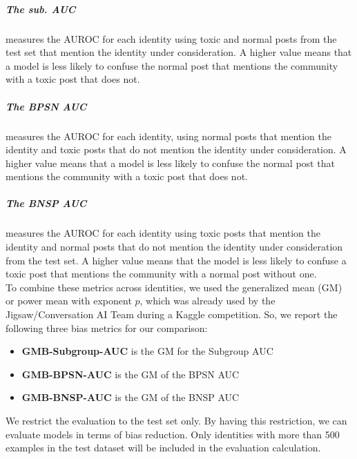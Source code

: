 \documentclass[a4paper,english]{rnti}
\makeatletter
\newcommand\foottotoref[1]{\protected@xdef\@thefnmark{\ref{#1}}\@footnotemark}
\makeatother
\begin{document}
 \subparagraph{The sub. AUC} measures the AUROC for each identity using toxic and normal posts from the test set that mention the identity under consideration. A higher value means that a model is less likely to confuse the normal post that mentions the community with a toxic post that does not. 
 
 \subparagraph{The BPSN AUC} measures the AUROC for each identity, using normal posts that mention the identity and toxic posts that do not mention the identity under consideration. A higher value means that a model is less likely to confuse the normal post that mentions the community with a toxic post that does not. 
 
 \subparagraph{The BNSP AUC} measures the AUROC for each identity using toxic posts that mention the identity and normal posts that do not mention the identity under consideration from the test set. A higher value means that the model is less likely to confuse a toxic post that mentions the community with a normal post without one.\\
 
To combine these metrics across identities, we used the generalized mean (GM) or power mean with exponent $p$, which was already used by the Jigsaw/Conversation AI Team during a Kaggle competition\foottotoref{civil-comments-data}. So, we report the following three bias metrics for our comparison:

\begin{itemize}
    \item \textbf{GMB-Subgroup-AUC} is the GM for the Subgroup AUC 
    \item \textbf{GMB-BPSN-AUC} is the GM of the  BPSN AUC 
    \item \textbf{GMB-BNSP-AUC} is the GM of the  BNSP AUC
\end{itemize}

We restrict the evaluation to the test set only. By having this restriction, we can evaluate models in terms of bias reduction. Only identities with more than 500 examples in the test dataset will be included in the evaluation calculation.
\end{document}
